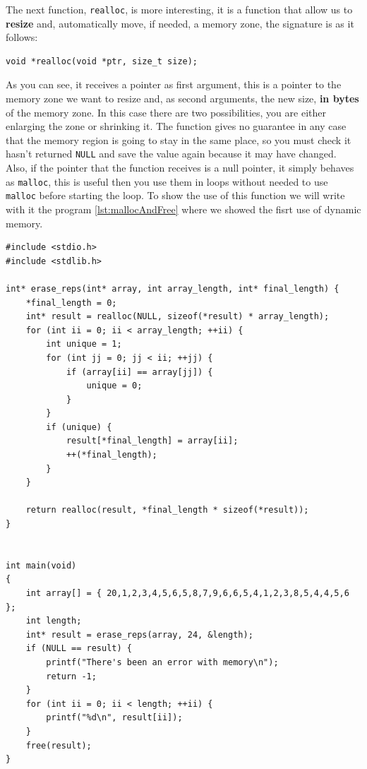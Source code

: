 \documentclass[a4paper]{article}
\begin{document}
The next function, \verb!realloc!, is more interesting, it is a function that
allow us to \textbf{resize} and, automatically move, if needed, a memory zone,
the signature is as it follows:

\noindent
\begin{minipage}[H]{\linewidth}
\mbox{}
\begin{lstlisting}[style=C,
caption={Signature of function \texttt{realloc}},
label={lst:callocSignature}]
void *realloc(void *ptr, size_t size);
\end{lstlisting}
\end{minipage}

As you can see, it receives a pointer as first argument, this is a pointer to
the memory zone we want to resize and, as second arguments, the new size,
\textbf{in bytes} of the memory zone. In this case there are two possibilities,
you are either enlarging the zone or shrinking it. The function gives no
guarantee in any case that the memory region is going to stay in the same place,
so you must check it hasn't returned \verb!NULL! and save the value again
because it may have changed. Also, if the pointer that the function receives is
a null pointer, it simply behaves as \verb"malloc", this is useful then you use
them in loops without needed to use \verb!malloc! before starting the loop.
To show the use of this function we will write with it the program
\ref{lst:mallocAndFree} where we showed the fisrt use of dynamic memory.

\noindent
\begin{minipage}[H]{\linewidth}
\mbox{}
\begin{lstlisting}[style=C, label={lst:reallocExample},
caption={Utilización de \texttt{realloc}}]
#include <stdio.h>
#include <stdlib.h>

int* erase_reps(int* array, int array_length, int* final_length) {
    *final_length = 0;
    int* result = realloc(NULL, sizeof(*result) * array_length);
    for (int ii = 0; ii < array_length; ++ii) {
        int unique = 1;
        for (int jj = 0; jj < ii; ++jj) {
            if (array[ii] == array[jj]) {
                unique = 0;
            }
        }
        if (unique) {
            result[*final_length] = array[ii];
            ++(*final_length);
        }
    }

    return realloc(result, *final_length * sizeof(*result));
}


int main(void)
{
    int array[] = { 20,1,2,3,4,5,6,5,8,7,9,6,6,5,4,1,2,3,8,5,4,4,5,6 };
    int length;
    int* result = erase_reps(array, 24, &length);
    if (NULL == result) {
        printf("There's been an error with memory\n");
        return -1;
    }
    for (int ii = 0; ii < length; ++ii) {
        printf("%d\n", result[ii]);
    }
    free(result);
}
\end{lstlisting}
\end{minipage}
\end{document}
